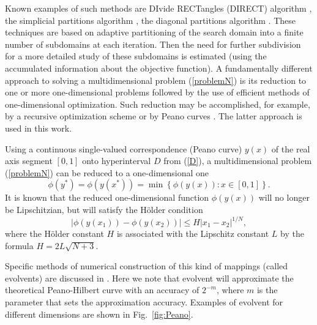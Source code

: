 \documentclass[mathematics,article,submit,pdftex,moreauthors]{Definitions/mdpi}
\begin{document}
Known examples of such methods are DIvide RECTangles (DIRECT) algorithm \cite{Jones1993}, the simplicial partitions algorithm \cite{PaulaviciusZilinskas2014}, the diagonal partitions algorithm \cite{Sergeyev2017}. These techniques are based on adaptive partitioning of the search domain into a finite number of subdomains at each iteration.
Then the need for further subdivision for a more detailed study of these subdomains is estimated (using the accumulated information about the objective function). 
A fundamentally different approach to solving a multidimensional problem (\ref{problemN}) is its reduction to one or more one-dimensional problems followed by the use of efficient methods of one-dimensional optimization. Such reduction may be accomplished, for example, by a recursive optimization scheme \cite{Grishagin2018} or by Peano curves \cite{Barkalov2018}. The latter approach is used in this work.

Using a continuous single-valued correspondence (Peano curve) $y(x)$ of the real axis segment $[0,1]$ onto hyperinterval $D$ from (\ref{D}), a multidimensional problem (\ref{problemN}) can be reduced to a one-dimensional one
\[
\phi(y^\ast)=\phi(y(x^\ast))=\min{\left\{\phi(y(x)): x\in[0,1]\right\}}.
\]
It is known \cite{Strongin2000, Sergeyev2013} that the reduced one-dimensional function $\phi(y(x))$ will no longer be Lipschitzian, but will satisfy the H{\"o}lder condition
\[
\left|\phi(y(x_1))-\phi(y(x_2))\right|\leq H\left|x_1-x_2\right|^{1/N},
\]
where the H{\"o}lder constant $H$ is associated with the Lipschitz constant $L$ by the formula $ H=2 L \sqrt{N+3}$.

Specific methods of numerical construction of this kind of mappings (called evolvents) are discussed in \cite{Strongin2000,Sergeyev2013}.
Here we note that evolvent will approximate the theoretical Peano-Hilbert curve with an accuracy of $2^{-m}$, where $m$ is the parameter that sets the approximation accuracy. Examples of evolvent for different dimensions are shown in Fig.~\ref{fig:Peano}.
\end{document}
